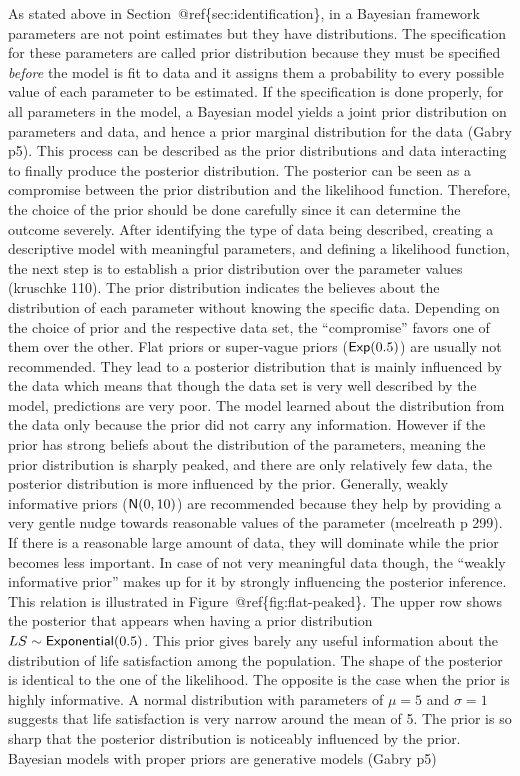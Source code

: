 \documentclass[a4, 12pt]{article}
\begin{document}
\label{sec:priors}
As stated above in Section~@ref\{sec:identification\}, in a Bayesian framework parameters are not point estimates but they have distributions. The specification for these parameters are called prior distribution because they must be specified \emph{before} the model is fit to data and it assigns them a probability to every possible value of each parameter to be estimated. If the specification is done properly, for all parameters in the model, a Bayesian model yields a joint prior distribution on parameters and data, and hence a prior marginal distribution for the data (Gabry p5). This process can be described as the prior distributions and data interacting to finally produce the posterior distribution. The posterior can be seen as a compromise between the prior distribution and the likelihood function. Therefore, the choice of the prior should be done carefully since it can determine the outcome severely. After identifying the type of data being described, creating a descriptive model with meaningful parameters, and defining a likelihood function, the next step is to establish a prior distribution over the parameter values (kruschke 110). The prior distribution indicates the believes about the distribution of each parameter without knowing the specific data. Depending on the choice of prior and the respective data set, the ``compromise'' favors one of them over the other. Flat priors or super-vague priors (\({\sf Exp}(0.5)\)) are usually not recommended. They lead to a posterior distribution that is mainly influenced by the data which means that though the data set is very well described by the model, predictions are very poor. The model learned about the distribution from the data only because the prior did not carry any information. However if the prior has strong beliefs about the distribution of the parameters, meaning the prior distribution is sharply peaked, and there are only relatively few data, the posterior distribution is more influenced by the prior. Generally, weakly informative priors (\({\sf N}(0,10)\)) are recommended because they help by providing a very gentle nudge towards reasonable values of the parameter (mcelreath p 299). If there is a reasonable large amount of data, they will dominate while the prior becomes less important. In case of not very meaningful data though, the ``weakly informative prior'' makes up for it by strongly influencing the posterior inference. This relation is illustrated in Figure~@ref\{fig:flat-peaked\}. The upper row shows the posterior that appears when having a prior distribution \(LS \sim {\sf Exponential}(0.5)\). This prior gives barely any useful information about the distribution of life satisfaction among the population. The shape of the posterior is identical to the one of the likelihood. The opposite is the case when the prior is highly informative. A normal distribution with parameters of \(\mu = 5\) and \(\sigma = 1\) suggests that life satisfaction is very narrow around the mean of 5. The prior is so sharp that the posterior distribution is noticeably influenced by the prior. Bayesian models with proper priors are generative models (Gabry p5)
\end{document}
